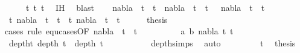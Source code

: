 \begin{isabellebody}
\ \ \ \ \ t{}{\isacharprime}{\kern0pt}\ t{}{\isacharprime}{\kern0pt}\ t{}{\isacharprime}{\kern0pt}\ \isamarkupfalse%
\ IH\ \isamarkupfalse%
\ blast\isanewline
\ \ \isamarkupfalse%
\ {\isachardoublequoteopen}nabla\ {\isasymturnstile}\ t{}\ {\isasymapprox}\ t{}\ {\isasymLongrightarrow}\ nabla\ {\isasymturnstile}\ t{}\ {\isasymapprox}\ t{}\ {\isasymLongrightarrow}\ \ nabla\ {\isasymturnstile}\ t{}\ {\isasymapprox}\ t{}{\isachardoublequoteclose}\isanewline
\ \ \isamarkupfalse%
{\isacharminus}{\kern0pt}\isanewline
\ \ \ \ \isamarkupfalse%
\ t{}{}{\isacharcolon}{\kern0pt}\ {\isachardoublequoteopen}nabla\ {\isasymturnstile}\ t{}\ {\isasymapprox}\ t{}{\isachardoublequoteclose}\ \ t{}{}{\isacharcolon}{\kern0pt}\ {\isachardoublequoteopen}nabla\ {\isasymturnstile}\ t{}\ {\isasymapprox}\ t{}{\isachardoublequoteclose}\isanewline
\ \ \ \ \isamarkupfalse%
\ {\isacharquery}{\kern0pt}thesis\isanewline
\ \ \ \ \ \isamarkupfalse%
{\isacharparenleft}{\kern0pt}cases\ rule{\isacharcolon}{\kern0pt}\ equ{\isachardot}{\kern0pt}cases{\isacharbrackleft}{\kern0pt}OF\ {\isacartoucheopen}nabla\ {\isasymturnstile}\ t{}\ {\isasymapprox}\ t{}{\isacartoucheclose}{\isacharbrackright}{\kern0pt}{\isacharparenright}{\kern0pt}\isanewline
\ \ \ \ \ \ \ \isamarkupfalse%
\ {\isacharparenleft}{\kern0pt}{}\ a\ b\ nabla\ t{}{\isacharprime}{\kern0pt}\ t{}{\isacharprime}{\kern0pt}{\isacharparenright}{\kern0pt}\isanewline
\ \ \ \ \ \ \ \isamarkupfalse%
\ {}{\isacharparenleft}{\kern0pt}{}{\isacharparenright}{\kern0pt}\ \isamarkupfalse%
\ deptht{}{\isacharcolon}{\kern0pt}\ {\isachardoublequoteopen}depth\ t{}{\isacharprime}{\kern0pt}\ {\isacharless}{\kern0pt}\ depth\ t{}{\isachardoublequoteclose}\isanewline
\ \ \ \ \ \ \ \ \ \isamarkupfalse%
\ depth{\isachardot}{\kern0pt}simps{\isacharparenleft}{\kern0pt}{}{\isacharparenright}{\kern0pt}\ \isamarkupfalse%
\ auto\isanewline
\ \ \ \ \ \ \ \isamarkupfalse%
\ t{}{}\ \isamarkupfalse%
\ {\isacharquery}{\kern0pt}thesis\isanewline
\ \ \ \ \ \ \ \isamarkupfalse%

\end{isabellebody}
